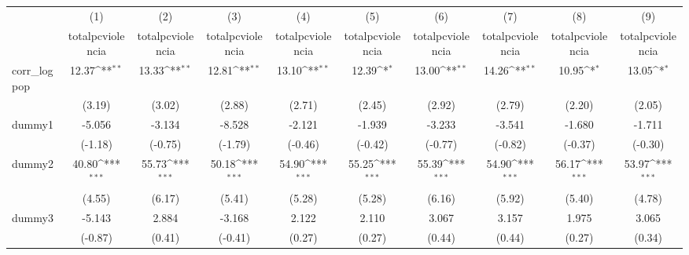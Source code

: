 {
\def\sym#1{\ifmmode^{#1}\else\(^{#1}\)\fi}
\begin{tabular}{l*{9}{c}}
\hline\hline
            &\multicolumn{1}{c}{(1)}&\multicolumn{1}{c}{(2)}&\multicolumn{1}{c}{(3)}&\multicolumn{1}{c}{(4)}&\multicolumn{1}{c}{(5)}&\multicolumn{1}{c}{(6)}&\multicolumn{1}{c}{(7)}&\multicolumn{1}{c}{(8)}&\multicolumn{1}{c}{(9)}\\
            &\multicolumn{1}{c}{totalpcviolencia}&\multicolumn{1}{c}{totalpcviolencia}&\multicolumn{1}{c}{totalpcviolencia}&\multicolumn{1}{c}{totalpcviolencia}&\multicolumn{1}{c}{totalpcviolencia}&\multicolumn{1}{c}{totalpcviolencia}&\multicolumn{1}{c}{totalpcviolencia}&\multicolumn{1}{c}{totalpcviolencia}&\multicolumn{1}{c}{totalpcviolencia}\\
\hline
corr\_logpop &       12.37\sym{**} &       13.33\sym{**} &       12.81\sym{**} &       13.10\sym{**} &       12.39\sym{*}  &       13.00\sym{**} &       14.26\sym{**} &       10.95\sym{*}  &       13.05\sym{*}  \\
            &      (3.19)         &      (3.02)         &      (2.88)         &      (2.71)         &      (2.45)         &      (2.92)         &      (2.79)         &      (2.20)         &      (2.05)         \\
[1em]
dummy1      &      -5.056         &      -3.134         &      -8.528         &      -2.121         &      -1.939         &      -3.233         &      -3.541         &      -1.680         &      -1.711         \\
            &     (-1.18)         &     (-0.75)         &     (-1.79)         &     (-0.46)         &     (-0.42)         &     (-0.77)         &     (-0.82)         &     (-0.37)         &     (-0.30)         \\
[1em]
dummy2      &       40.80\sym{***}&       55.73\sym{***}&       50.18\sym{***}&       54.90\sym{***}&       55.25\sym{***}&       55.39\sym{***}&       54.90\sym{***}&       56.17\sym{***}&       53.97\sym{***}\\
            &      (4.55)         &      (6.17)         &      (5.41)         &      (5.28)         &      (5.28)         &      (6.16)         &      (5.92)         &      (5.40)         &      (4.78)         \\
[1em]
dummy3      &      -5.143         &       2.884         &      -3.168         &       2.122         &       2.110         &       3.067         &       3.157         &       1.975         &       3.065         \\
            &     (-0.87)         &      (0.41)         &     (-0.41)         &      (0.27)         &      (0.27)         &      (0.44)         &      (0.44)         &      (0.27)         &      (0.34)         \\

\end{tabular}}
